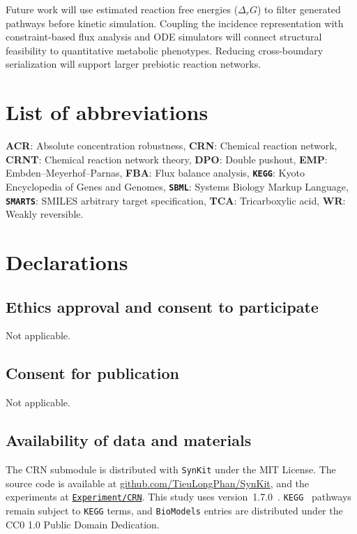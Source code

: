 \documentclass[10pt,a4paper,fleqn]{article}
\newcommand{\synkit}{\texttt{SynKit}\xspace}
\begin{document}
Future work will use estimated reaction free energies ($\Delta_r G$) to filter generated pathways before kinetic simulation. Coupling the incidence representation with constraint-based flux analysis and ODE simulators will connect structural feasibility to quantitative metabolic phenotypes. Reducing cross-boundary serialization will support larger prebiotic reaction networks.

\section*{List of abbreviations}
\noindent \textbf{ACR}: Absolute concentration robustness, \textbf{CRN}: Chemical reaction network, \textbf{CRNT}: Chemical reaction network theory, \textbf{DPO}: Double pushout, \textbf{EMP}: Embden--Meyerhof--Parnas, \textbf{FBA}: Flux balance analysis, \textbf{\texttt{KEGG}}: Kyoto Encyclopedia of Genes and Genomes, \textbf{\texttt{SBML}}: Systems Biology Markup Language, \textbf{\texttt{SMARTS}}: SMILES arbitrary target specification, \textbf{TCA}: Tricarboxylic acid, \textbf{WR}: Weakly reversible.

\section*{Declarations}

\subsection*{Ethics approval and consent to participate}
Not applicable.

\subsection*{Consent for publication}
Not applicable.

\subsection*{Availability of data and materials}
The CRN submodule is distributed with \synkit under the MIT License.
The source code is available at \href{https://github.com/TieuLongPhan/SynKit}{github.com/TieuLongPhan/SynKit}, and the experiments at \href{https://github.com/TieuLongPhan/SynKit/tree/v1.7.0/Experiment/CRN}{\texttt{Experiment/CRN}}. This study uses version~1.7.0~\cite{synkit170release}.
\texttt{KEGG}~\cite{kanehisa2025kegg} pathways remain subject to \texttt{KEGG} terms, and \texttt{BioModels} entries are distributed under the CC0 1.0 Public Domain Dedication.
\end{document}
